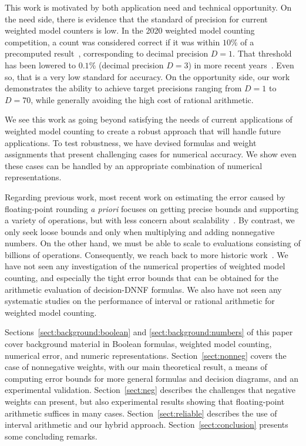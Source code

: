 \documentclass[
hf
]{ceurart}
\begin{document}
This work is motivated by both application need and technical
opportunity.  On the need side, there is evidence that the standard of
precision for current weighted model counters is low.  In the 2020
weighted model counting competition, a count was considered correct if
it was within $10\%$ of a precomputed result~\cite{fichte:jea:2020},
corresponding to decimal precision $D=1$.  That threshold has been
lowered to $0.1\%$ (decimal precision $D=3$) in more recent
years~\cite{hecher:mc:2024}.  Even so, that is a very low standard for
accuracy.  On the opportunity side, our work demonstrates the ability to achieve
target precisions ranging from $D=1$ to $D=70$, while generally
avoiding the high cost of rational arithmetic.   

We see this work as going beyond satisfying the needs of current
applications of weighted model counting to create a robust approach
that will handle future applications.  To test robustness, we have
devised formulas and weight assignments that present challenging cases
for numerical accuracy.  We show even these cases can be handled by an
appropriate combination of numerical representations.

Regarding previous work, most recent work on estimating the error
caused by floating-point rounding \emph{a priori} focuses on getting precise bounds
and supporting a variety of
operations, but with less concern about scalability~\cite{becker:fmcad:2016,magron:toms:2017,solovyev:toplas:2018}.
By contrast, we only seek
loose bounds and only when multiplying and
adding nonnegative numbers.  On the other hand, we must be able to scale to evaluations consisting of billions of operations.
Consequently, we reach back to
more historic work~\cite{wilkinson:nm:1960,wilkinson:rounding:1964}.
We have not seen any investigation of the numerical properties of weighted model counting, and especially
the tight error bounds that can be obtained for the arithmetic evaluation of decision-DNNF formulas.
We also have not seen any systematic studies on the performance of interval or rational arithmetic for
weighted model counting.


Sections~\ref{sect:background:boolean} and
\ref{sect:background:numbers} of this paper cover background material in Boolean
formulas, weighted model counting, numerical error, and numeric
representations.  Section~\ref{sect:nonneg} covers the case of nonnegative weights,
with our main theoretical result,
a means of computing error bounds for more general formulas and decision diagrams,
and an experimental validation.
Section~\ref{sect:neg} describes the challenges that negative
weights can present, but also experimental results showing that
floating-point arithmetic suffices in many cases.
Section~\ref{sect:reliable} describes the use of interval
arithmetic and our hybrid approach.  
Section~\ref{sect:conclusion}
presents some concluding remarks.
\end{document}
